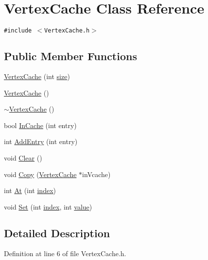 \hypertarget{class_vertex_cache}{
\section{VertexCache Class Reference}
\label{class_vertex_cache}
}
{\tt \#include $<$VertexCache.h$>$}

\subsection*{Public Member Functions}
\begin{CompactItemize}
\item 
\hyperlink{class_vertex_cache_587d829d8f0a42dabaa227b15e0ac112}{VertexCache} (int \hyperlink{glext__bak_8h_3d1e3edfcf61ca2d831883e1afbad89e}{size})
\item 
\hyperlink{class_vertex_cache_0cba52679f1eb2fa5567b1a0a3c50df6}{VertexCache} ()
\item 
\hyperlink{class_vertex_cache_a2fa6694132b839b3c7faa2a3d60a388}{$\sim$VertexCache} ()
\item 
bool \hyperlink{class_vertex_cache_be2ee2c8ee859aa4a0d201ab0d033b33}{InCache} (int entry)
\item 
int \hyperlink{class_vertex_cache_cb5d10cb90a7d87391c70c7724ab6064}{AddEntry} (int entry)
\item 
void \hyperlink{class_vertex_cache_915a13823a5f2d0304df086edc38e985}{Clear} ()
\item 
void \hyperlink{class_vertex_cache_39b101c4bddc59cc8cac176a5ad3857d}{Copy} (\hyperlink{class_vertex_cache}{VertexCache} $\ast$inVcache)
\item 
int \hyperlink{class_vertex_cache_4696b88833b6375eab111aeec93a89f3}{At} (int \hyperlink{glext__bak_8h_57f14e05b1900f16a2da82ade47d0c6d}{index})
\item 
void \hyperlink{class_vertex_cache_3edb54161593c38eebc7e8e284d95008}{Set} (int \hyperlink{glext__bak_8h_57f14e05b1900f16a2da82ade47d0c6d}{index}, int \hyperlink{glext__bak_8h_6a4f8a1a444e9080b297963b3db29fe0}{value})
\end{CompactItemize}


\subsection{Detailed Description}


Definition at line 6 of file VertexCache.h.

